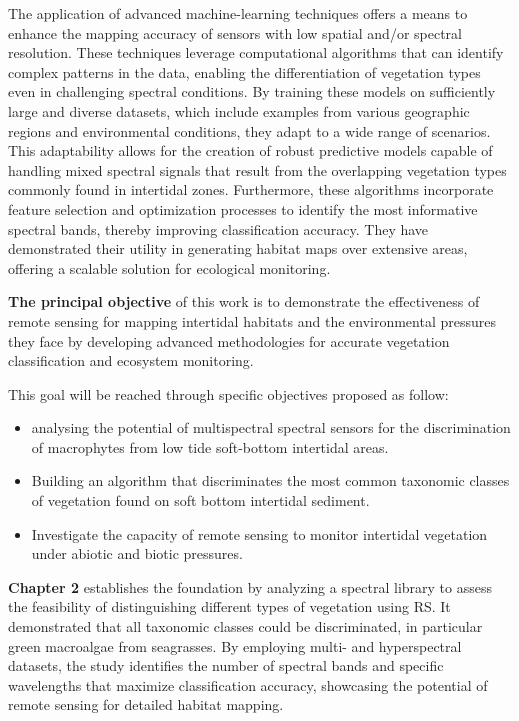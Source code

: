 \documentclass[
  letterpaper,
  11pt,
  english,
  singlespacing,
  headsepline]{MastersDoctoralThesis}
\begin{document}
\begin{spacing}{1.5}
The application of advanced machine-learning techniques offers a means
to enhance the mapping accuracy of sensors with low spatial and/or
spectral resolution. These techniques leverage computational algorithms
that can identify complex patterns in the data, enabling the
differentiation of vegetation types even in challenging spectral
conditions. By training these models on sufficiently large and diverse
datasets, which include examples from various geographic regions and
environmental conditions, they adapt to a wide range of scenarios. This
adaptability allows for the creation of robust predictive models capable
of handling mixed spectral signals that result from the overlapping
vegetation types commonly found in intertidal zones. Furthermore, these
algorithms incorporate feature selection and optimization processes to
identify the most informative spectral bands, thereby improving
classification accuracy. They have demonstrated their utility in
generating habitat maps over extensive areas, offering a scalable
solution for ecological monitoring.

\textbf{The principal objective} of this work is to demonstrate the
effectiveness of remote sensing for mapping intertidal habitats and the
environmental pressures they face by developing advanced methodologies
for accurate vegetation classification and ecosystem monitoring.

This goal will be reached through specific objectives proposed as
follow:

\begin{itemize}
\item
  analysing the potential of multispectral spectral sensors for the
  discrimination of macrophytes from low tide soft-bottom intertidal
  areas.
\item
  Building an algorithm that discriminates the most common taxonomic
  classes of vegetation found on soft bottom intertidal sediment.
\item
  Investigate the capacity of remote sensing to monitor intertidal
  vegetation under abiotic and biotic pressures.
\end{itemize}

\textbf{Chapter 2} establishes the foundation by analyzing a spectral
library to assess the feasibility of distinguishing different types of
vegetation using RS. It demonstrated that all taxonomic classes could be
discriminated, in particular green macroalgae from seagrasses. By
employing multi- and hyperspectral datasets, the study identifies the
number of spectral bands and specific wavelengths that maximize
classification accuracy, showcasing the potential of remote sensing for
detailed habitat mapping.


\end{spacing}
\end{document}
